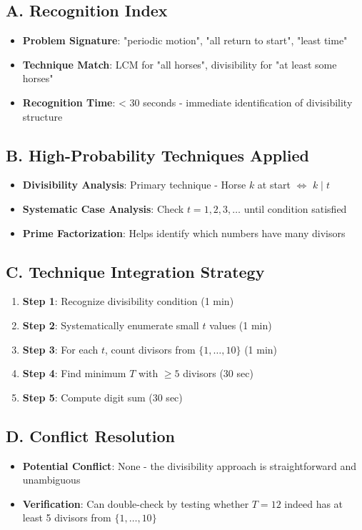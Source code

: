 \documentclass[]{article}
\begin{document}
\begin{conversionbox}
\subsection*{A. Recognition Index}
\begin{itemize}[leftmargin=*]
    \item \textbf{Problem Signature}: "periodic motion", "all return to start", "least time"
    \item \textbf{Technique Match}: LCM for "all horses", divisibility for "at least some horses"
    \item \textbf{Recognition Time}: < 30 seconds - immediate identification of divisibility structure
\end{itemize}

\subsection*{B. High-Probability Techniques Applied}
\begin{itemize}[leftmargin=*]
    \item \textbf{Divisibility Analysis}: Primary technique - Horse $k$ at start $\Leftrightarrow$ $k \mid t$
    \item \textbf{Systematic Case Analysis}: Check $t = 1, 2, 3, \ldots$ until condition satisfied
    \item \textbf{Prime Factorization}: Helps identify which numbers have many divisors
\end{itemize}

\subsection*{C. Technique Integration Strategy}
\begin{enumerate}[leftmargin=*]
    \item \textbf{Step 1}: Recognize divisibility condition (1 min)
    \item \textbf{Step 2}: Systematically enumerate small $t$ values (1 min)
    \item \textbf{Step 3}: For each $t$, count divisors from $\{1,\ldots,10\}$ (1 min)
    \item \textbf{Step 4}: Find minimum $T$ with $\geq 5$ divisors (30 sec)
    \item \textbf{Step 5}: Compute digit sum (30 sec)
\end{enumerate}

\subsection*{D. Conflict Resolution}
\begin{itemize}[leftmargin=*]
    \item \textbf{Potential Conflict}: None - the divisibility approach is straightforward and unambiguous
    \item \textbf{Verification}: Can double-check by testing whether $T = 12$ indeed has at least 5 divisors from $\{1,\ldots,10\}$
\end{itemize}
\end{conversionbox}
\end{document}
